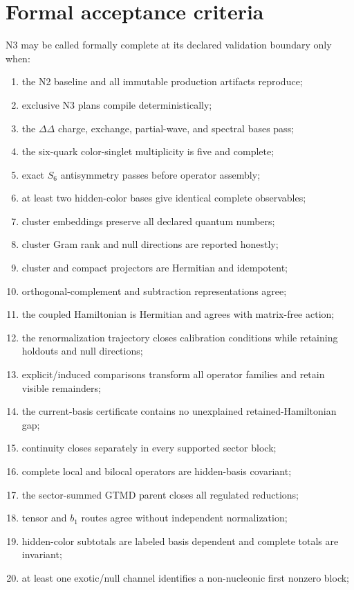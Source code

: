 \documentclass[11pt]{article}
\begin{document}
\section{Formal acceptance criteria}
\label{sec:acceptance}

N3 may be called formally complete at its declared validation boundary only when:
\begin{enumerate}
\item the N2 baseline and all immutable production artifacts reproduce;
\item exclusive N3 plans compile deterministically;
\item the \(\Delta\Delta\) charge, exchange, partial-wave, and spectral bases pass;
\item the six-quark color-singlet multiplicity is five and complete;
\item exact \(S_6\) antisymmetry passes before operator assembly;
\item at least two hidden-color bases give identical complete observables;
\item cluster embeddings preserve all declared quantum numbers;
\item cluster Gram rank and null directions are reported honestly;
\item cluster and compact projectors are Hermitian and idempotent;
\item orthogonal-complement and subtraction representations agree;
\item the coupled Hamiltonian is Hermitian and agrees with matrix-free action;
\item the renormalization trajectory closes calibration conditions while retaining holdouts and null directions;
\item explicit/induced comparisons transform all operator families and retain visible remainders;
\item the current-basis certificate contains no unexplained retained-Hamiltonian gap;
\item continuity closes separately in every supported sector block;
\item complete local and bilocal operators are hidden-basis covariant;
\item the sector-summed GTMD parent closes all regulated reductions;
\item tensor and \(b_1\) routes agree without independent normalization;
\item hidden-color subtotals are labeled basis dependent and complete totals are invariant;
\item at least one exotic/null channel identifies a non-nucleonic first nonzero block;

\end{enumerate}
\end{document}
